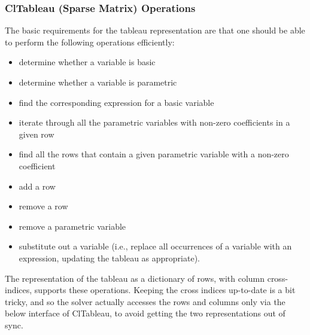 \documentclass{article}
\begin{document}
\subsubsection{{\sf ClTableau} (Sparse Matrix) Operations }
\label{cl-tableau-implementation}

The basic requirements for the tableau representation are that one should
be able to perform the following operations efficiently:

\begin{itemize}

\item determine whether a variable is basic

\item determine whether a variable is parametric

\item find the corresponding expression for a basic variable

\item iterate through all the parametric variables with non-zero
coefficients in a given row

\item find all the rows that contain a given parametric variable with a
non-zero coefficient

\item add a row

\item remove a row

\item remove a parametric variable

\item substitute out a variable (i.e., replace all occurrences of a
variable with an expression, updating the tableau as appropriate).

\end{itemize}

The representation of the tableau as a dictionary of rows, with column
cross-indices, supports these operations.  Keeping the cross indices
up-to-date is a bit tricky, and so the solver actually accesses the rows
and columns only via the below interface of {\sf ClTableau}, to avoid
getting the two representations out of sync.
\end{document}
